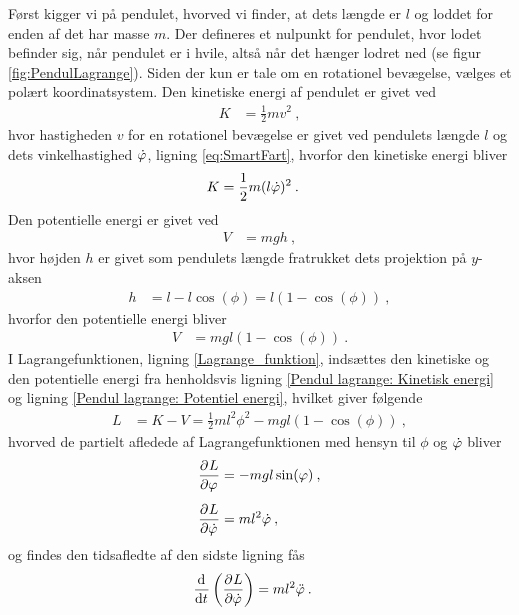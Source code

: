 \noindent
Først kigger vi på pendulet, hvorved vi finder, at dets længde er $l$ og loddet for enden af det har masse $m$. Der defineres et nulpunkt for pendulet, hvor lodet befinder sig, når pendulet er i hvile, altså når det hænger lodret ned (se figur \ref{fig:PendulLagrange}).
Siden der kun er tale om en rotationel bevægelse, vælges et polært koordinatsystem. Den kinetiske energi af pendulet er givet ved
%
\begin{align}
	K &= \frac{1}{2} m v^2 \: ,
\end{align}
%
hvor hastigheden $v$ for en rotationel bevægelse er givet ved pendulets længde $l$ og dets vinkelhastighed $\dot{\varphi}$, ligning \eqref{eq:SmartFart}, hvorfor den kinetiske energi bliver
%
\begin{align} \label{Pendul lagrange: Kinetisk energi}
	K &= \frac{1}{2} m (l \dot{\varphi})^2 \: .
\end{align}
%
Den potentielle energi er givet ved
%
\begin{align}
	V &= mgh \: ,
\end{align}
%
hvor højden $h$ er givet som pendulets længde fratrukket dets projektion på $y$-aksen
%
\begin{align} \label{Pendul lagrange: Hoejde over nul}
	h &= l - l \cos(\phi) = l(1-\cos(\phi)) \: ,
\end{align}
%
hvorfor den potentielle energi bliver
%
\begin{align} \label{Pendul lagrange: Potentiel energi}
	V &= mgl \left(1-\cos(\phi) \right) \: .
\end{align}
%
I Lagrangefunktionen, ligning \eqref{Lagrange_funktion}, indsættes den kinetiske og den potentielle energi fra henholdsvis ligning \eqref{Pendul lagrange: Kinetisk energi} og ligning \eqref{Pendul lagrange: Potentiel energi}, hvilket giver følgende
%
\begin{align}
	L &= K - V = \frac{1}{2} m l^2 \phi^2 - mgl(1-\cos(\phi)) \: ,
\end{align}
%
hvorved de partielt afledede af Lagrangefunktionen med hensyn til $\phi$ og $\dot{\varphi}$ bliver
%
\begin{align}
	\frac{\partial^{}{L}}{\partial {\varphi}^{}} &= - mgl \sin(\varphi) \: , \label{Pendul Lagrange: Partiel afledede mht phi} \\[.5em]
	\frac{\partial^{}{L}}{\partial {\dot{\varphi}}^{}} &= m l^2 \dot{\varphi} \: ,
\end{align}
%
og findes den tidsafledte af den sidste ligning fås
%
\begin{align}
	\frac{\mathrm{d}^{}{}}{{\mathrm{d} {t}}^{}} \left(\frac{\partial^{}{L}}{\partial {\dot{\varphi}}^{}}\right) &= m l^2 \ddot{\varphi} \: . \label{Pendul Lagrange: Tidsafledede}
\end{align}
